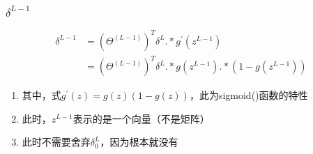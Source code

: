 
\subsubsection{$\delta^{L-1}$}
\begin{equation}\begin{aligned}
	\delta^{L-1} &= (\Theta^{(L-1)})^T \delta^{L} .* g^{'}(z^{L-1}) \\
	&= (\Theta^{(L-1)})^T \delta^{L} .* g(z^{L-1}) .* (1-g(z^{L-1}))
\end{aligned}\end{equation}
\begin{enumerate}
	\item 其中，式$g^{'}(z) = g(z)(1-g(z))$，此为sigmoid()函数的特性
	\item 此时，$z^{L-1}$表示的是一个向量（不是矩阵）
	\item 此时不需要舍弃$\delta_0^{L}$，因为根本就没有
\end{enumerate}

